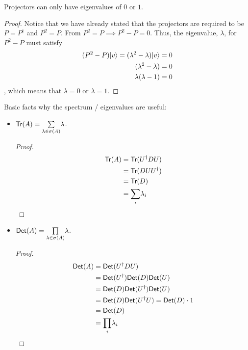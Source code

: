 \documentclass[12pt]{article}
\begin{document}
\begin{proposition}\label{prop:unity-of-projectors}
Projectors can only have eigenvalues of $0$ or $1$.
\end{proposition}
\begin{proof}
Notice that we have already stated that the projectors are required to be $P = P^\dag$ and $P^2 = P$. From $P^2 = P\implies P^2 - P = 0$. Thus, the eigenvalue, $\lambda$, for $P^2-P$ must satisfy $$
\begin{aligned}
(P^2 - P) \Ket{v} = (\lambda^2 - \lambda) \Ket{v}
    &= 0 \\
(\lambda^2 - \lambda)
    &= 0 \\
\lambda (\lambda - 1)
    &= 0
\end{aligned}
$$, which means that $\lambda = 0$ or $\lambda = 1$.
\end{proof}

\begin{proposition}\label{prop:basic-tr-eigenvalues} Basic facts why the spectrum / eigenvalues are useful:
\begin{itemize}
    \item $\Trace{A} = \underset{\lambda\in \sigma(A)}{\sum} \lambda$.
    \begin{proof}
        $$
        \begin{aligned}
            \Trace{A}
                &= \Trace{U^\dag D U} \\
                &= \Trace{D UU^\dag} \\
                &= \Trace{D} \\
                &= \underset{i}{\sum} \lambda_i
        \end{aligned}
        $$
    \end{proof}
    \item $\Det{A} = \underset{\lambda\in \sigma(A)}{\prod} \lambda$.
    \begin{proof}
        $$
        \begin{aligned}
            \Det{A}
                &= \Det{U^\dag D U} \\
                &= \Det{U^\dag}\Det{D}\Det{U} \\
                &= \Det{D}\Det{U^\dag}\Det{U} \\
                &= \Det{D}\Det{U^\dag U} = \Det{D}\cdot 1 \\
                &= \Det{D}\\
                &= \underset{i}{\prod} \lambda_i
        \end{aligned}
        $$
    \end{proof}
\end{itemize}
\end{proposition}
\end{document}
